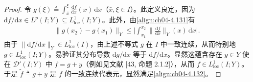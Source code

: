\documentclass[../../main.tex]{subfiles}%
\begin{document}
\begin{proof}
令 $g(\xi)\triangleq \int_{\bar x}^{\xi}\frac{\mathrm{d}f}{\mathrm{d}x}(x)\,\mathrm{d}x$（$\bar x,\xi\in I$）。此定义良定，因为 $\mathrm{d}f/\mathrm{d}x\in L^p(I;Y)\subseteq L^1_{\mathrm{loc}}(I;Y)$。此外，由\eqref{align:ch04-4.131}有
\begin{align*}
\|g(x_2)-g(x_1)\|_Y\leqslant\Big|\int_{x_1}^{x_2}\Big\|\frac{\mathrm{d}f}{\mathrm{d}x}\Big\|_Y(x)\,\mathrm{d}x\Big|.
\end{align*}
由于 $\|\mathrm{d}f/\mathrm{d}x\|_Y\in L^1_{\mathrm{loc}}(I)$，由上述不等式 $g$ 在 $I$ 中一致连续，从而特别地 $g\in L^1_{\mathrm{loc}}(I;Y)$。易验证其分布导数 $\mathrm{d}g/\mathrm{d}x$ 等于 $\mathrm{d}f/\mathrm{d}x$。显然这蕴含存在 $y\in Y$ 使在 $\mathcal{D}'(I;Y)$ 中 $f=g+y$（例如见文献 [43, 命题 2.1.2]），从而 $f\in L^1_{\mathrm{loc}}(I;Y)$。于是 $\tilde f\triangleq g+y$ 是 $f$ 的一致连续代表元，显然满足\eqref{align:ch04-4.132}。
\end{proof}
\end{document}
